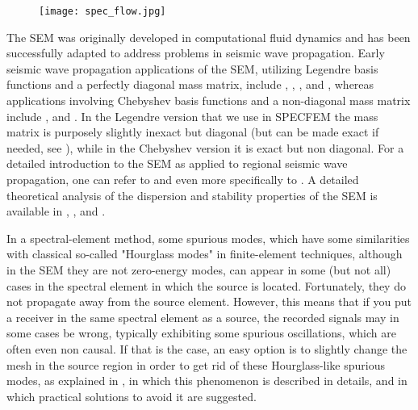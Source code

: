 \clearpage

        \begin{figure}[htbp]
            \centerline{\texttt{[image: spec\_flow.jpg]}}
        \label{fig:spec_flow}
        \end{figure}

The SEM was originally developed in computational fluid dynamics \citep{Patera1984Aspectralelement,MaPa89}
and has been successfully adapted to address problems in seismic wave
propagation. Early seismic wave propagation applications of the SEM,
utilizing Legendre basis functions and a perfectly diagonal mass matrix,
include \citet{CoJoTo93}, \citet{Kom97}, \citet{FaMaPaQu97},
\citet{KoVi98} and \citet{KoTr99}, whereas applications involving
Chebyshev basis functions and a non-diagonal mass matrix include \citet{SePr94}, \citet{PrCaSe94} and \citet{SePrPr95}.
In the Legendre version that we use in SPECFEM the mass matrix is purposely slightly inexact but diagonal (but can be made exact if needed, see \cite{Teu15}),
while in the Chebyshev version it is exact but non diagonal.
For a detailed introduction to the SEM as applied to regional seismic
wave propagation, one can refer to \citet{KoVi98,KoTr99,ChKoViCaVaFe07,TrKoLi08}
and even more specifically to \citet{Lee2009Effectsoftopography,LeChKoHuTr09}.
A detailed theoretical analysis of the dispersion
and stability properties of the SEM is available in \citet{Coh02}, \citet{DeSe07}, \citet{SeOl07} and \citet{MeStTh12}.

In a spectral-element method, some spurious modes, which have some similarities with classical so-called "Hourglass modes" in finite-element techniques,
although in the SEM they are not zero-energy modes, can appear in some (but not all) cases in the spectral element in which the source is located.
Fortunately, they do not propagate away from the source element.
However, this means that if you put a receiver in the same spectral element as a source, the recorded signals may in some cases be wrong, typically exhibiting some spurious
oscillations, which are often even non causal.
If that is the case, an easy option is to slightly change the mesh in the source region in order to get rid of these Hourglass-like spurious modes,
as explained in \cite{DuLiScGa14}, in which this phenomenon is described in details, and in which practical solutions to avoid it are suggested.

